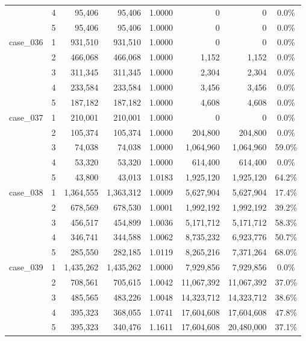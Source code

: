 \begin{footnotesize}
\begin{longtable}{l c rr c rr c}
 & 4 & 95{,}406 & 95{,}406 & 1.0000 & 0 & 0 & 0.0\% \\
 & 5 & 95{,}406 & 95{,}406 & 1.0000 & 0 & 0 & 0.0\% \\
\addlinespace[2pt]
case\_036 & 1 & 931{,}510 & 931{,}510 & 1.0000 & 0 & 0 & 0.0\% \\
 & 2 & 466{,}068 & 466{,}068 & 1.0000 & 1{,}152 & 1{,}152 & 0.0\% \\
 & 3 & 311{,}345 & 311{,}345 & 1.0000 & 2{,}304 & 2{,}304 & 0.0\% \\
 & 4 & 233{,}584 & 233{,}584 & 1.0000 & 3{,}456 & 3{,}456 & 0.0\% \\
 & 5 & 187{,}182 & 187{,}182 & 1.0000 & 4{,}608 & 4{,}608 & 0.0\% \\
\addlinespace[2pt]
case\_037 & 1 & 210{,}001 & 210{,}001 & 1.0000 & 0 & 0 & 0.0\% \\
 & 2 & 105{,}374 & 105{,}374 & 1.0000 & 204{,}800 & 204{,}800 & 0.0\% \\
 & 3 & 74{,}038 & 74{,}038 & 1.0000 & 1{,}064{,}960 & 1{,}064{,}960 & 59.0\% \\
 & 4 & 53{,}320 & 53{,}320 & 1.0000 & 614{,}400 & 614{,}400 & 0.0\% \\
 & 5 & 43{,}800 & 43{,}013 & 1.0183 & 1{,}925{,}120 & 1{,}925{,}120 & 64.2\% \\
\addlinespace[2pt]
case\_038 & 1 & 1{,}364{,}555 & 1{,}363{,}312 & 1.0009 & 5{,}627{,}904 & 5{,}627{,}904 & 17.4\% \\
 & 2 & 678{,}569 & 678{,}530 & 1.0001 & 1{,}992{,}192 & 1{,}992{,}192 & 39.2\% \\
 & 3 & 456{,}517 & 454{,}899 & 1.0036 & 5{,}171{,}712 & 5{,}171{,}712 & 58.3\% \\
 & 4 & 346{,}741 & 344{,}588 & 1.0062 & 8{,}735{,}232 & 6{,}923{,}776 & 50.7\% \\
 & 5 & 285{,}550 & 282{,}185 & 1.0119 & 8{,}265{,}216 & 7{,}371{,}264 & 68.0\% \\
\addlinespace[2pt]
case\_039 & 1 & 1{,}435{,}262 & 1{,}435{,}262 & 1.0000 & 7{,}929{,}856 & 7{,}929{,}856 & 0.0\% \\
 & 2 & 708{,}561 & 705{,}615 & 1.0042 & 11{,}067{,}392 & 11{,}067{,}392 & 37.0\% \\
 & 3 & 485{,}565 & 483{,}226 & 1.0048 & 14{,}323{,}712 & 14{,}323{,}712 & 38.6\% \\
 & 4 & 395{,}323 & 368{,}055 & 1.0741 & 17{,}604{,}608 & 17{,}604{,}608 & 47.8\% \\
 & 5 & 395{,}323 & 340{,}476 & 1.1611 & 17{,}604{,}608 & 20{,}480{,}000 & 37.1\% \\

\end{longtable}
\end{footnotesize}
